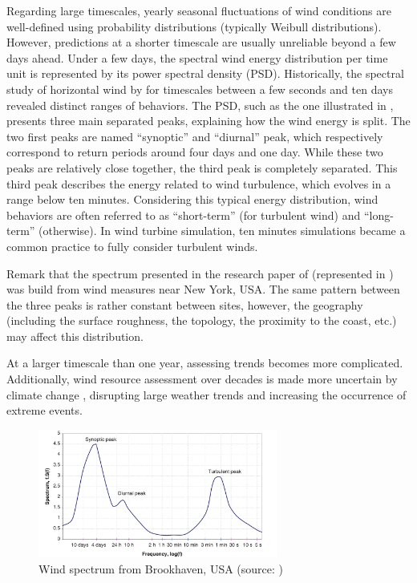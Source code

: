 Regarding large timescales, yearly seasonal fluctuations of wind conditions are well-defined using probability distributions (typically Weibull distributions). 
However, predictions at a shorter timescale are usually unreliable beyond a few days ahead. 
Under a few days, the spectral wind energy distribution per time unit is represented by its power spectral density (PSD). 
Historically, the spectral study of horizontal wind by \citet{van_1957_wind_psd} for timescales between a few seconds and ten days revealed distinct ranges of behaviors. 
The PSD, such as the one illustrated in , presents three main separated peaks, explaining how the wind energy is split. 
The two first peaks are named ``synoptic'' and ``diurnal'' peak, which respectively correspond to return periods around four days and one day. 
While these two peaks are relatively close together, the third peak is completely separated. 
This third peak describes the energy related to wind turbulence, which evolves in a range below ten minutes. 
Considering this typical energy distribution, wind behaviors are often referred to as ``short-term'' (for turbulent wind) and ``long-term'' (otherwise). 
In wind turbine simulation, ten minutes simulations became a common practice to fully consider turbulent winds. 

Remark that the spectrum presented in the research paper of \citet{van_1957_wind_psd} (represented in ) was build from wind measures near New York, USA. 
The same pattern between the three peaks is rather constant between sites, however, the geography (including the surface roughness, the topology, the proximity to the coast, etc.) may affect this distribution. 

At a larger timescale than one year, assessing trends becomes more complicated. 
Additionally, wind resource assessment over decades is made more uncertain by climate change \cite{nagababu_2023_climate_change}, disrupting large weather trends and increasing the occurrence of extreme events. 

\begin{figure}
    \centering
    \includegraphics[width=0.7\textwidth]{./part1/figures/wind_spectrum.png}
    \caption{Wind spectrum from Brookhaven, USA (source: \citealt{burton_2021_wind_handbook})}
    \label{fig:wind_psd}
\end{figure}


